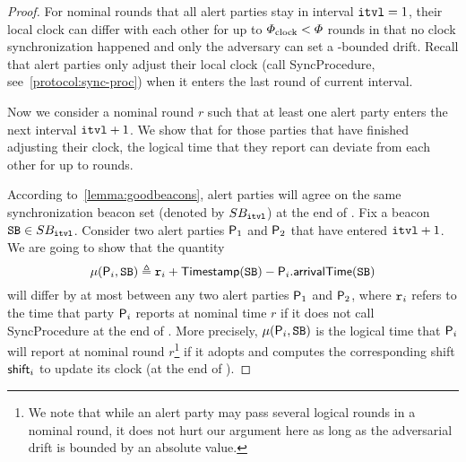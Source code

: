 \begin{proof}
    For nominal rounds that all alert parties stay in interval $\mathtt{itvl}  = 1$, their local clock can differ with each other for up to $\varPhi_{\mathrm{clock}} < \varPhi$ rounds in that no clock synchronization happened and only the adversary can set a \maxdrift-bounded drift.
    Recall that alert parties only adjust their local clock (call \textsf   {SyncProcedure}, see~\cref{protocol:sync-proc}) when it enters the last round of current interval.

    Now we consider a nominal round $r$ such that at least one alert party enters the next interval $\mathtt{itvl} + 1$.
    We show that for those parties that have finished adjusting their clock, the logical time that they report can deviate from each other for up to \maxskew rounds.

    According to~\cref{lemma:goodbeacons}, alert parties will agree on the same synchronization beacon set (denoted by $SB_\mathtt{itvl}$) at the end of \interval.
    Fix a beacon $\mathtt{SB} \in SB_\mathtt{itvl}$.
    Consider two alert parties $\mathsf{P}_1$ and $\mathsf{P}_2$ that have entered $\mathtt{itvl} + 1$.
    We are going to show that the quantity
    \[ \mu (\mathsf{P}_i, \mathtt{SB}) \triangleq \mathtt{r}_i + \mathsf{Timestamp}(\mathtt{SB}) - \mathsf{P}_i.\mathsf{arrivalTime}(\mathtt{SB}) \]
    will differ by at most \maxskew between any two alert parties $\mathsf{P}_1$ and $\mathsf{P}_2$, where $\mathtt{r}_i$ refers to the time that party $\mathsf{P}_i$ reports at nominal time $r$ if it does not call \textsf{SyncProcedure} at the end of \interval.
    More precisely, $\mu (\mathsf{P}_i, \mathtt{SB})$ is the logical time that $\mathsf{P}_i$ will report at nominal round $r$\footnote{We note that while an alert party may pass several logical rounds in a nominal round, it does not hurt our argument here as long as the adversarial drift is bounded by an absolute value.} if it adopts \beacon and computes the corresponding shift $\mathsf{shift}_i$ to update its clock (at the end of \interval).


\end{proof}
